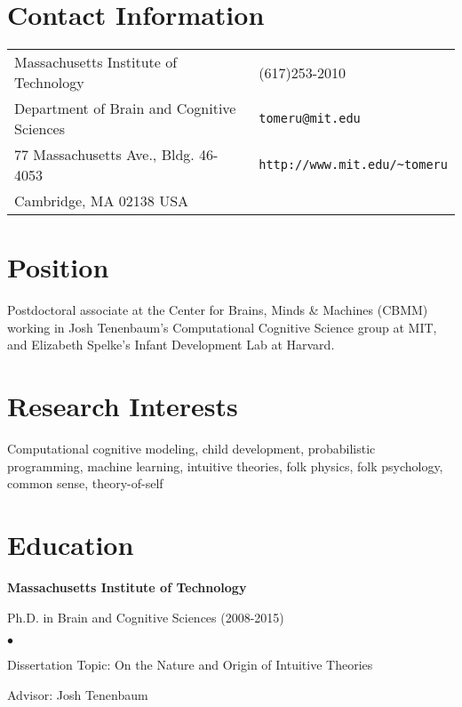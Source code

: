 \documentclass[margin,line,pifont,palatino,courier]{res}
\newenvironment{list1}{
  \begin{list}{\ding{113}}{%
      \setlength{\itemsep}{0in}
      \setlength{\parsep}{0in} \setlength{\parskip}{0in}
      \setlength{\topsep}{0in} \setlength{\partopsep}{0in}
      \setlength{\leftmargin}{0.17in}}}{\end{list}}
\newenvironment{list2}{
  \begin{list}{$\bullet$}{%
      \setlength{\itemsep}{0in}
      \setlength{\parsep}{0in} \setlength{\parskip}{0in}
      \setlength{\topsep}{0in} \setlength{\partopsep}{0in}
      \setlength{\leftmargin}{0.2in}}}{\end{list}}
\begin{document}

\begin{resume}

\section{\sc Contact Information}

\vspace{.05in}
\begin{tabular}{@{}p{2.75in}p{2in}}
Massachusetts Institute of Technology & (617)253-2010 \\
Department of Brain and Cognitive Sciences                        & \verb+tomeru@mit.edu+\\
77 Massachusetts Ave., Bldg. 46-4053            & \verb+http://www.mit.edu/~tomeru+\\
Cambridge, MA 02138 USA               & \\
\end{tabular}

\section{\sc Position}
Postdoctoral associate at the Center for Brains, Minds \& Machines (CBMM) working in Josh Tenenbaum's Computational Cognitive Science group at MIT, and Elizabeth Spelke's Infant Development Lab at Harvard. 

\section{\sc Research Interests}
Computational cognitive modeling, child development, probabilistic programming, machine learning, intuitive theories, folk physics, folk psychology, common sense, theory-of-self

\section{\sc Education}

{\bf Massachusetts Institute of Technology}\\
\vspace*{-.1in}
\begin{list1}
\item[] Ph.D. in Brain and Cognitive Sciences (2008-2015)

\begin{list2}
\vspace*{.05in}
\item Dissertation Topic:  On the Nature and Origin of Intuitive Theories
\item Advisor: Josh Tenenbaum
\end{list2}
\end{list1}


\end{resume}
\end{document}
